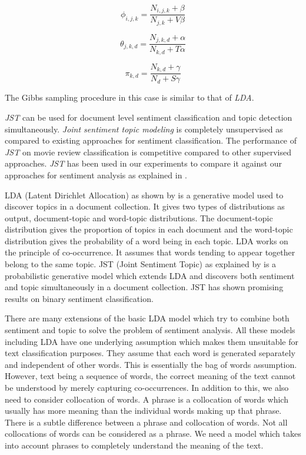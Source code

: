 \begin{equation}
\phi_{i,j,k} = \frac{N_{i,j,k}+\beta}{N_{j,k}+V\beta}
\end{equation}

\begin{equation}
\theta_{j,k,d} = \frac{N_{j,k,d}+\alpha}{N_{k,d}+T\alpha}
\end{equation}

\begin{equation}
\pi_{k,d} = \frac{N_{k,d}+\gamma}{N_{d}+S\gamma}
\end{equation}

The Gibbs sampling procedure in this case is similar to that of \textit{LDA}. 

\par
\textit{JST} can be used for document level sentiment classification and topic detection simultaneously. \textit{Joint sentiment topic modeling} is completely unsupervised
as compared to existing approaches for sentiment classification. The performance of \textit{JST} on movie review classification is competitive compared to other supervised
approaches. \textit{JST} has been used in our experiments to compare it against our approaches for sentiment analysis as explained in .

LDA (Latent Dirichlet Allocation) as shown by \citep*{blei2003latent} is a generative model used to discover topics in a document collection. It gives two types of 
distributions as output, document-topic and word-topic distributions. The document-topic distribution gives the proportion of topics in each document and the word-topic
distribution gives the probability of a word being in each topic. LDA works on the principle of co-occurrence. It assumes that words tending to appear together belong 
to the same topic. JST (Joint Sentiment Topic) as explained by \citep*{lin2009joint} is a probabilistic generative model which extends LDA and discovers both sentiment
and topic simultaneously in a document collection. JST has shown promising results on binary sentiment classification. 

There are many extensions of the basic LDA model which try to combine both sentiment and topic to solve the problem of sentiment analysis. All these models including LDA
have one underlying assumption which makes them unsuitable for text classification purposes. They assume that each word is generated separately and independent of other
words. This is essentially the bag of words assumption. However, text being a sequence of words, the correct meaning of the text cannot be understood by merely capturing
co-occurrences. In addition to this, we also need to consider collocation of words. A phrase is a collocation of words which usually has more meaning than the individual 
words making up that phrase. There is a subtle difference between a phrase and collocation of words. Not all collocations of words can be considered as a phrase. We need
a model which takes into account phrases to completely understand the meaning of the text.

